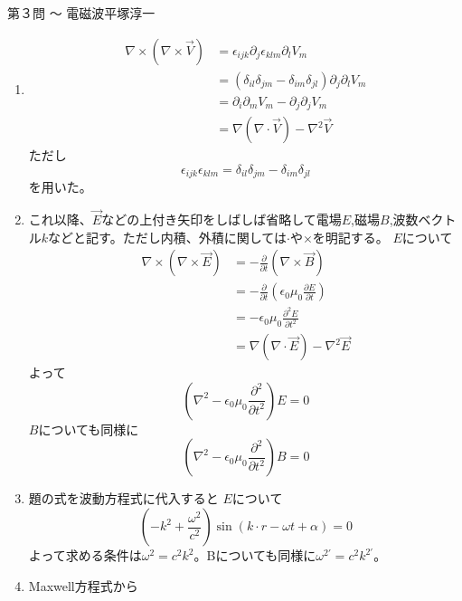 \begin{answer}{第３問 〜 電磁波}{平塚淳一}
\begin{enumerate}
\item 
  \begin{align}
  \nabla \times(\nabla \times \overrightarrow{V})
  &=\epsilon_{ijk} \partial_j \epsilon_{klm} \partial_l V_m\\
  &=(\delta_{il} \delta_{jm} - \delta_{im} \delta_{jl})\partial_j \partial_l V_m\\
  &=\partial_i \partial_m V_m - \partial_j \partial_j V_m\\
  &=\nabla(\nabla \cdot \overrightarrow{V}) - \nabla^2 \overrightarrow{V}
  \end{align}
  ただし
  \begin{equation}
  \epsilon_{ijk}\epsilon_{klm}
  =\delta_{il} \delta_{jm} - \delta_{im} \delta_{jl}
  \end{equation}
  を用いた。
\item これ以降、$\overrightarrow{E}$などの上付き矢印をしばしば省略して電場$E$,磁場$B$,波数ベクトル$k$などと記す。ただし内積、外積に関しては$\cdot$や$\times$を明記する。
  $E$について
  \begin{align}
  \nabla \times(\nabla \times \overrightarrow{E})
  &=-\frac{\partial}{\partial t}(\nabla \times \overrightarrow{B})\\
  &=-\frac{\partial}{\partial t}(\epsilon_0\mu_0\frac{\partial E}{\partial t})\\
  &=-\epsilon_0\mu_0\frac{\partial^2 E}{\partial t^2}\\
  &=\nabla(\nabla \cdot \overrightarrow{E}) - \nabla^2 \overrightarrow{E}
  \end{align}
  よって
  \begin{equation}
  (\nabla^2 - \epsilon_0\mu_0\frac{\partial^2}{\partial t^2})E=0
  \end{equation}
  $B$についても同様に
  \begin{equation}
  (\nabla^2 - \epsilon_0\mu_0\frac{\partial^2}{\partial t^2})B=0
  \end{equation}
\item 題の式を波動方程式に代入すると
  $E$について
  \begin{equation}
  (-k^2+\frac{\omega^2}{c^2})\sin(k \cdot r - \omega t + \alpha)=0
  \end{equation}
  よって求める条件は$\omega^2=c^2k^2$。Bについても同様に$\omega^{2 \prime} =c^2k^{2 \prime}$。
\item Maxwell方程式から

\end{enumerate}
\end{answer}
